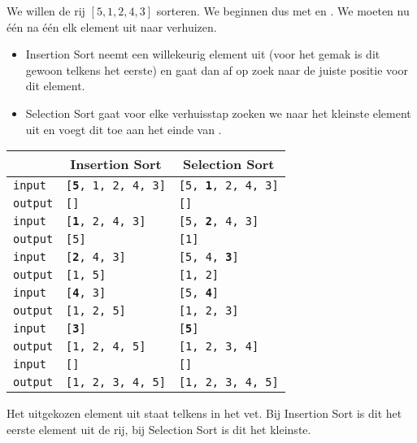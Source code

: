 \begin{example}
We willen de rij $[5, 1, 2, 4, 3]$ sorteren. We beginnen dus met
 en .
We moeten nu \'e\'en na \'e\'en elk element uit 
naar  verhuizen.
\begin{itemize}
  \item Insertion Sort neemt een willekeurig element uit 
        (voor het gemak is dit gewoon telkens het eerste) en gaat
        dan  af op zoek naar de juiste positie voor dit element.
  \item Selection Sort gaat voor elke verhuisstap zoeken we naar het kleinste element uit  en
        voegt dit toe aan het einde van .
\end{itemize}
\begin{center}
  \newcommand{\HL}[1]{{\bfseries #1}}
  \begin{tabular}{l|l|l}
    & \multicolumn{1}{c}{\bf Insertion Sort} & \multicolumn{1}{c}{\bf Selection Sort} \\
     \hline\hline
       {\tt input} & {\tt [\HL5, 1, 2, 4, 3]} & {\tt [5, \HL1, 2, 4, 3]} \\
       {\tt output} & {\tt []} & {\tt []}
\\ \hline
      {\tt input} & {\tt [\HL1, 2, 4, 3]} & {\tt [5, \HL2, 4, 3]} \\
      {\tt output} & {\tt [5]} & {\tt [1]}
\\ \hline
      {\tt input} & {\tt [\HL2, 4, 3]} & {\tt [5, 4, \HL3]} \\
      {\tt output} & {\tt [1, 5]} & {\tt [1, 2]}
\\ \hline
      {\tt input} & {\tt [\HL4, 3]}& {\tt [5, \HL4]} \\
      {\tt output} & {\tt [1, 2, 5]} & {\tt [1, 2, 3]}
\\ \hline
      {\tt input} & {\tt [\HL3]}& {\tt [\HL5]} \\
      {\tt output} & {\tt [1, 2, 4, 5]} & {\tt [1, 2, 3, 4]}
\\ \hline
      {\tt input} & {\tt []} & {\tt []} \\
      {\tt output} & {\tt [1, 2, 3, 4, 5]} & {\tt [1, 2, 3, 4, 5]}
  \end{tabular}
\end{center}
Het uitgekozen element uit  staat telkens in het vet. Bij Insertion Sort
is dit het eerste element uit de rij, bij Selection Sort is dit het kleinste.
\end{example}

